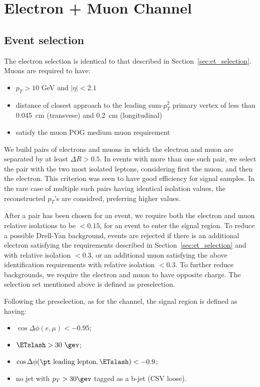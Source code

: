 \section{Electron + Muon Channel}\label{sec:eMu}

\subsection{Event selection}\label{sec:em_selection}

The electron selection is identical to that described in
Section~\ref{sec:et_selection}.  Muons are required to have:
\begin{itemize}
  \item $p_{T} > 10$ GeV and $\vert \eta \vert < 2.1$
  \item distance of closest approach to the leading sum-$p_T^2$ 
    primary vertex of less than 0.045~cm (transvese) and 0.2~cm (longitudinal)
  \item satisfy the muon POG medium muon requirement
\end{itemize}

We build pairs of electrons and muons in which the electron and muon
are separated by at least $\Delta R > 0.5$.  In events with more than
one such pair, we select the pair with the two most isolated leptons,
considering first the muon, and then the electron.  This criterion was
seen to have good efficiency for signal samples.  In the rare case of
multiple such pairs having identical isolation values, the
reconstructed $p_T$'s are considred, preferring higher values.

After a pair has been chosen for an event, we require both the
electron and muon relative isolations to be $<0.15$, for an event to
enter the signal region.  To reduce a possible Drell-Yan background,
events are rejected if there is an additional electron satisfying the
requirements described in Section~\ref{sec:et_selection} and with
relative isolation $<0.3$, or an additional muon satisfying the above
identification requirements with relative isolation $<0.3$. To further 
reduce backgrounds, we require the electron and muon to have 
opposite charge. The selection set mentioned above is defined as preselection.

Following the preselection, as for the \thth channel, the signal 
region is defined as having:
\begin{itemize}
  \item $\cos{\Delta \phi (e,\mu)}<-0.95$;
  \item $\ETslash>30~\gev$;
  \item $\cos{\Delta \phi (\pt\text{ leading lepton},\ETslash)}<-0.9$;
  \item no jet with $p_T>30\gev$ tagged as a b-jet (CSV loose)\quad.
\end{itemize}

